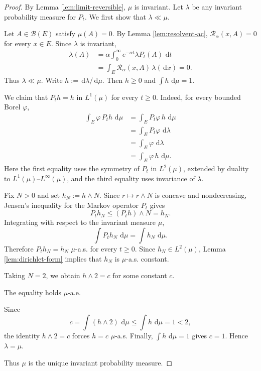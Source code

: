 \documentclass[12pt]{article}
\numberwithin{equation}{section}
\newcommand{\dd}{\,\mathrm d}
\newcommand{\1}{\mathbf 1}
\newcommand{\cB}{\mathcal B}
\newcommand{\review}[1]{\begin{reviewbox}#1\end{reviewbox}}
\begin{document}
\begin{proof}
By Lemma \ref{lem:limit-reversible}, $\mu$ is invariant. Let $\lambda$ be any
invariant probability measure for $P_t$. We first show that $\lambda\ll\mu$.

Let $A\in\cB(E)$ satisfy $\mu(A)=0$. By Lemma \ref{lem:resolvent-ac},
$\mathcal R_\alpha(x,A)=0$ for every $x\in E$. Since $\lambda$ is invariant,
\[
\begin{aligned}
        \lambda(A)
        &=
        \alpha\int_0^\infty e^{-\alpha t}\lambda P_t(A)\,\dd t        \\
        &=
        \int_E \mathcal R_\alpha(x,A)\,\lambda(\dd x)
        =0.
\end{aligned}
\]
Thus $\lambda\ll\mu$. Write $h:=\dd\lambda/\dd\mu$. Then $h\geq0$ and
$\int h\,\dd\mu=1$.

We claim that $P_t h=h$ in $L^1(\mu)$ for every $t\geq0$. Indeed, for every bounded
Borel $\varphi$,
\[
\begin{aligned}
        \int_E \varphi\,P_t h\,\dd\mu
        &=
        \int_E P_t\varphi\, h\,\dd\mu                         \\
        &=
        \int_E P_t\varphi\,\dd\lambda                         \\
        &=
        \int_E \varphi\,\dd\lambda                            \\
        &=
        \int_E \varphi\,h\,\dd\mu .
\end{aligned}
\]
Here the first equality uses the symmetry of $P_t$ in $L^2(\mu)$, extended by
duality to $L^1(\mu)$--$L^\infty(\mu)$, and the third equality uses invariance of
$\lambda$.

Fix $N>0$ and set $h_N:=h\wedge N$. Since $r\mapsto r\wedge N$ is concave and
nondecreasing, Jensen's inequality for the Markov operator $P_t$ gives
\[
        P_t h_N \leq (P_t h)\wedge N=h_N.
\]
Integrating with respect to the invariant measure $\mu$,
\[
        \int P_t h_N\,\dd\mu=\int h_N\,\dd\mu.
\]
Therefore $P_t h_N=h_N$ $\mu$-a.s. for every $t\geq0$. Since $h_N\in L^2(\mu)$,
Lemma \ref{lem:dirichlet-form} implies that $h_N$ is $\mu$-a.s. constant.

Taking $N=2$, we obtain $h\wedge2=c$ for some constant $c$. \review{The equality holds $\mu$-a.e.} Since
\[
        c=\int (h\wedge2)\,\dd\mu\leq \int h\,\dd\mu=1<2,
\]
the identity $h\wedge2=c$ forces $h=c$ $\mu$-a.s. Finally,
$\int h\,\dd\mu=1$ gives $c=1$. Hence $\lambda=\mu$.

Thus $\mu$ is the unique invariant probability measure.
\end{proof}
\end{document}
